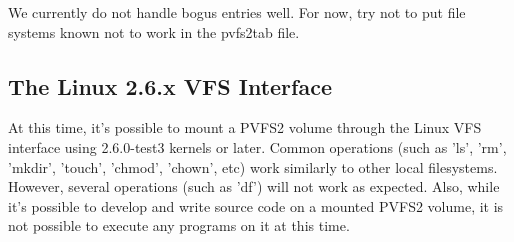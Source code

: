 \documentclass[11pt, letterpaper]{article}
\begin{document}
We currently do not handle bogus entries well.  For now, try not to put file
systems known not to work in the pvfs2tab file.

\subsection{The Linux 2.6.x VFS Interface}

At this time, it's possible to mount a PVFS2 volume through the Linux
VFS interface using 2.6.0-test3 kernels or later.  Common operations
(such as 'ls', 'rm', 'mkdir', 'touch', 'chmod', 'chown', etc) work
similarly to other local filesystems.  However, several operations
(such as 'df') will not work as expected.  Also, while it's possible
to develop and write source code on a mounted PVFS2 volume, it is not
possible to execute any programs on it at this time.

\end{document}
